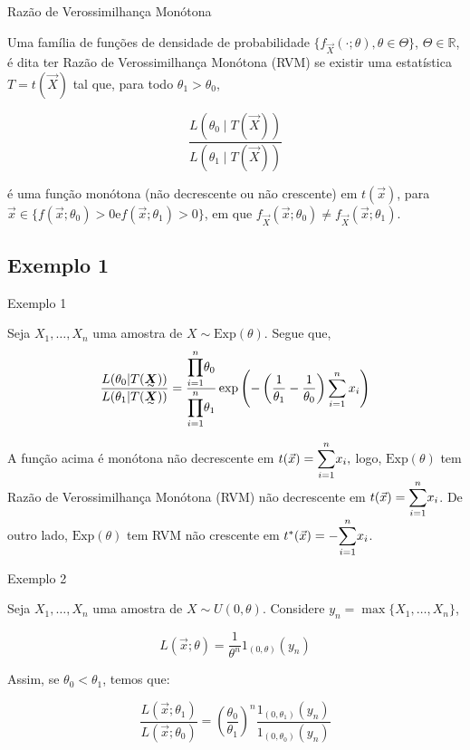 \documentclass[12pt]{beamer}
\begin{document}
\begin{frame}{Razão de Verossimilhança Monótona}
\begin{definicao}
\justifying
Uma família de funções de densidade de probabilidade \(\{f_{\vec{X}}(\cdot; \theta), \theta \in \Theta\}\), \(\Theta \in \mathbb{R}\), é dita ter Razão de Verossimilhança Monótona (RVM) se existir uma estatística \(T = t(\vec{X})\) tal que, para todo \(\theta_1 > \theta_0\),

\[
\frac{L(\theta_0 \mid T(\vec{X}))}{L(\theta_1 \mid T(\vec{X}))}
\]

é uma função monótona (não decrescente ou não crescente) em \(t(\vec{x})\), para \(\vec{x} \in \{f(\vec{x}; \theta_0) > 0 \text{e} f(\vec{x}; \theta_1) > 0\}\), em que \(f_{\vec{X}}(\vec{x}; \theta_0) \neq f_{\vec{X}}(\vec{x}; \theta_1)\).

\end{definicao}
\end{frame}

\subsection{Exemplo 1}
\begin{frame}{Exemplo 1}
\vspace{-0.3cm}
\begin{block}{}
\justifying
Seja $X_1, \ldots, X_n$ uma amostra de $X \sim \text{Exp}(\theta)$. Segue que,
\[
\frac{L(\theta_0 | T(\tend{X}))}{L(\theta_1 | T(\tend{X}))} = \frac{{\displaystyle \prod_{i=1}^{n}} \theta_0}{{\displaystyle \prod_{i=1}^{n}} \theta_1} \exp\left(-\left(\frac{1}{\theta_1} - \frac{1}{\theta_0}\right)\sum_{i=1}^{n} x_i\right)
\]
\end{block}
\pause
\vspace{-0.3cm}
\begin{block}{}
\justifying
A função acima é monótona não decrescente em $t(\Vec{x}) = {\displaystyle \sum_{i=1}^{n}} x_i,$ logo, $\text{Exp}(\theta)$ tem Razão de Verossimilhança Monótona (RVM) não decrescente em $t(\Vec{x}) = {\displaystyle \sum_{i=1}^{n}} x_i$. De outro lado, $\text{Exp}(\theta)$ tem RVM não crescente em $t^{*}(\Vec{x}) = -{\displaystyle \sum_{i=1}^{n}} x_i$.
\end{block}
\end{frame}

\begin{frame}{Exemplo 2}
\begin{block}{}
\justifying
Seja \(X_1, \ldots, X_n\) uma amostra de \(X \sim U(0, \theta)\). Considere \(y_{n} = \max\{X_1, \ldots, X_n\}\),

\[
L(\vec{x}; \theta) = \frac{1}{\theta^n} 1_{(0, \theta)}(y_n)
\]

Assim, se \(\theta_0 < \theta_1\), temos que:

\[
\frac{L(\vec{x}; \theta_1)}{L(\vec{x}; \theta_0)} = \left(\frac{\theta_0}{\theta_1}\right)^n \frac{1_{(0, \theta_1)}(y_n)}{1_{(0, \theta_0)}(y_n)}
\]

\end{block}
\end{frame}
\end{document}
